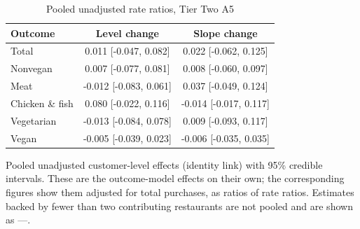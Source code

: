\begin{table}[H]
\centering
\caption{Pooled unadjusted rate ratios, Tier Two A5}
\label{tab:t2_a5_mu_gamma}
\begin{tabular}{lcc}
\toprule
Outcome & Level change & Slope change \\
\midrule
Total & 0.011 [-0.047, 0.082] & 0.022 [-0.062, 0.125] \\
Nonvegan & 0.007 [-0.077, 0.081] & 0.008 [-0.060, 0.097] \\
Meat & -0.012 [-0.083, 0.061] & 0.037 [-0.049, 0.124] \\
Chicken \& fish & 0.080 [-0.022, 0.116] & -0.014 [-0.017, 0.117] \\
Vegetarian & -0.013 [-0.084, 0.078] & 0.009 [-0.093, 0.117] \\
Vegan & -0.005 [-0.039, 0.023] & -0.006 [-0.035, 0.035] \\
\bottomrule
\end{tabular}
\par\smallskip\footnotesize Pooled unadjusted customer-level effects (identity link) with 95\% credible intervals. These are the outcome-model effects on their own; the corresponding figures show them adjusted for total purchases, as ratios of rate ratios. Estimates backed by fewer than two contributing restaurants are not pooled and are shown as ---.
\end{table}
